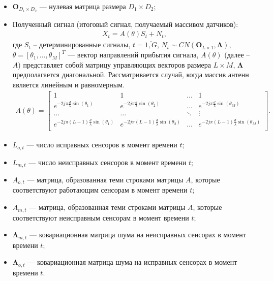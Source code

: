 \documentclass[11pt]{article}
\begin{document}
\begin{itemize}
\item
$\mathbf{O}_{D_1 \times D_2}$ --- нулевая матрица размера $D_1 \times D_2$;
\item
Полученный сигнал (итоговый сигнал, получаемый массивом датчиков):
\begin{equation}
\begin{gathered}
X_t=A(\theta)S_t+N_t,
\end{gathered}
\end{equation}
где $S_t$  -- детерминированные сигналы, $t=\overline{1,G}$, $N_t \sim CN(\mathbf{O}_{L \times 1}, \mathbf{\Lambda})$,  $\theta=[\theta_1,...,\theta_M]^T$ --- вектор направлений прибытия сигнала, $A(\theta)$ (далее -- $A$) представляет собой матрицу управляющих векторов размера $L \times M$, $\mathbf{\Lambda}$ предполагается диагональной. Рассматривается случай, когда массив антенн является линейным и равномерным.
\begin{gather}
A(\theta) = \begin{bmatrix}
1&1&\dots&1\\
e^{-2j\pi \frac{d}{\lambda}\sin(\theta_1)}& e^{-2j\pi \frac{d}{\lambda}\sin(\theta_2)}&\dots&e^{-2j\pi \frac{d}{\lambda}\sin(\theta_M)}\\
\dots&\dots&\ddots&\vdots\\
e^{-2j\pi (L-1) \frac{d}{\lambda}\sin(\theta_1)}& e^{-2j\pi (L-1) \frac{d}{\lambda}\sin(\theta_2)}&\dots&e^{-2j\pi (L-1) \frac{d}{\lambda}\sin(\theta_M)}\\
\end{bmatrix}.
\nonumber
\end{gather}
\end{itemize}
\begin{itemize}
\item
$L_{o,t}$ --- число исправных сенсоров в момент времени $t$;
\item
 $L_{m,t}$ --- число неисправных сенсоров в момент времени $t$;
\item 
$A_{o,t}$ --- матрица, образованная теми строками матрицы $A$, которые соответствуют работающим сенсорам в момент времени $t$; 
\item
$A_{m,t}$ --- матрица, образованная теми строками матрицы $A$, которые соответствуют неисправным сенсорам в момент времени $t$;
\item
$\mathbf{\Lambda}_{m,t}$ --- ковариационная матрица шума на неисправных сенсорах в момент времени $t$;
\item 
 $\mathbf{\Lambda}_{o,t}$ --- ковариационная матрица шума на исправных сенсорах в момент времени $t$.
\end{itemize}
\end{document}

